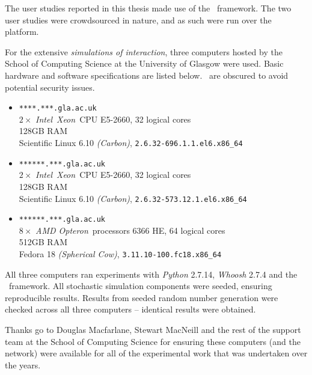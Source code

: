 
\begin{preamble}


The user studies reported in this thesis made use of the \treconomics~framework. The two user studies were crowdsourced in nature, and as such were run over the~ platform.

For the extensive \emph{simulations of interaction}, three computers hosted by the School of Computing Science at the University of Glasgow were used. Basic hardware and software specifications are listed below.~ are obscured to avoid potential security issues.

\begin{itemize}
    
    \item{\texttt{****.***.gla.ac.uk}\\$2\times$ \emph{Intel}\textregistered~\emph{Xeon}\textregistered~CPU E5-2660, 32 logical cores\\128GB RAM\\Scientific Linux 6.10 \emph{(Carbon)}, \texttt{2.6.32-696.1.1.el6.x86\_64}}
    
    \item{\texttt{******.***.gla.ac.uk}\\$2\times$ \emph{Intel}\textregistered~\emph{Xeon}\textregistered~CPU E5-2660, 32 logical cores\\128GB RAM\\Scientific Linux 6.10 \emph{(Carbon)}, \texttt{2.6.32-573.12.1.el6.x86\_64}}
    
    \item{\texttt{******.***.gla.ac.uk}\\$8\times$ \emph{AMD Opteron}\texttrademark~processors 6366 HE, 64 logical cores\\512GB RAM\\Fedora 18 \emph{(Spherical Cow)}, \texttt{3.11.10-100.fc18.x86\_64}}
    
\end{itemize}

All three computers ran experiments with \emph{Python} 2.7.14, \emph{Whoosh} 2.7.4 and the \simiir~framework. All stochastic simulation components were seeded, ensuring reproducible results. Results from seeded random number generation were checked across all three computers -- identical results were obtained.

Thanks go to Douglas Macfarlane, Stewart MacNeill and the rest of the support team at the School of Computing Science for ensuring these computers (and the network) were available for all of the experimental work that was undertaken over the years.
\end{preamble}

\newpage
\thispagestyle{empty}
\mbox{}
\newpage
\thispagestyle{empty}
\mbox{}
\newpage
